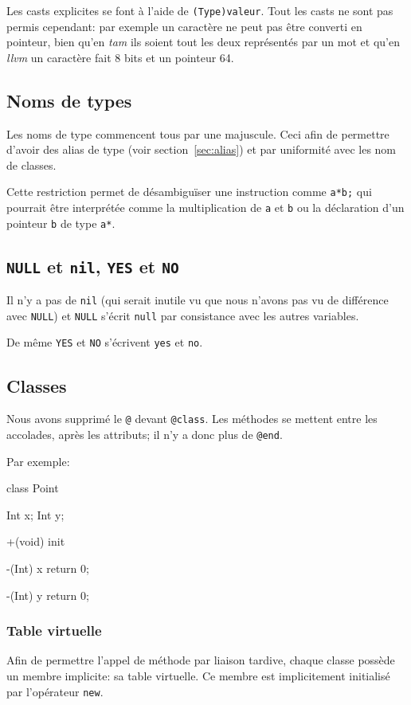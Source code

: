 \documentclass{scrartcl}
\newcommand{\llvm}{\textit{llvm}}
\newcommand{\tam} {\textit{tam}}
\begin{document}
      Les casts explicites se font à l'aide de \verb+(Type)valeur+. Tout les
      casts ne sont pas permis cependant: par exemple un caractère ne peut pas
      être converti en pointeur, bien qu'en \tam{} ils soient tout les deux
      représentés par un mot et qu'en \llvm{} un caractère fait 8 bits et un
      pointeur 64.

  \subsection{Noms de types}
    Les noms de type commencent tous par une majuscule. Ceci afin de permettre
    d'avoir des alias de type (voir section~\ref{sec:alias}) et par uniformité avec
    les nom de classes.

    Cette restriction permet de désambiguïser une instruction comme
    \verb+a*b;+ qui pourrait être interprétée comme la multiplication de
    \verb+a+ et \verb+b+ ou la déclaration d'un pointeur \verb+b+ de type
    \verb+a*+.

  \subsection{\texttt{NULL} et \texttt{nil}, \texttt{YES} et \texttt{NO}}
    Il n'y a pas de \verb+nil+ (qui serait inutile vu que nous n'avons pas vu
    de différence avec \verb+NULL+) et \verb+NULL+ s'écrit \verb+null+ par
    consistance avec les autres variables.

    De même \verb+YES+ et \verb+NO+ s'écrivent \verb+yes+ et \verb+no+.

  \subsection{Classes}
    Nous avons supprimé le \verb+@+ devant \verb+@class+. Les méthodes se
    mettent entre les accolades, après les attributs; il n'y a donc plus de
    \verb+@end+.

    Par exemple:
    \begin{moccode}
class Point {
    Int x;
    Int y;

    +(void) init {
    }

    -(Int) x {
        return 0;
    }

    -(Int) y {
        return 0;
    }
}
    \end{moccode}

    \subsubsection{Table virtuelle}\label{sec:vtable}
      Afin de permettre l'appel de méthode par liaison tardive, chaque classe
      possède un membre implicite: sa table virtuelle. Ce membre est
      implicitement initialisé par l'opérateur \verb+new+.
\end{document}
